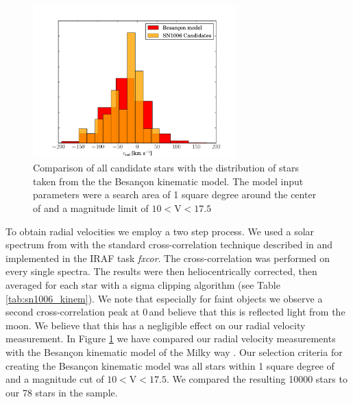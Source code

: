 \begin{figure}[tb] %
   \centering
   \includegraphics[width=0.7\textwidth]{chapter_sn1006/plots/sn1006_vrad_besancon.pdf} 
   \caption[Radial velocity of all candidates in SN 1006 compared with Besan\c{c}on Model]{Comparison of all candidate stars with the distribution of stars taken from the the Besan\c{c}on kinematic model. The model input parameters were a search area of 1 square degree around the center of  and a magnitude limit of $10<\textrm{V}<17.5$}
   \label{fig:sn1006_vrad_comp}
\end{figure}


To obtain radial velocities we employ a two step process. We used a solar spectrum from \citet{1984sfat.book.....K} with the standard cross-correlation technique described in \citet{1979AJ.....84.1511T} and implemented in the IRAF task \textit{fxcor}. The cross-correlation was performed on every single spectra. The results were then heliocentrically corrected, then averaged for each star with a sigma clipping algorithm (see Table \ref{tab:sn1006_kinem}). We note that especially for faint objects we observe a second cross-correlation peak at 0\,\kms and believe that this is reflected light from the moon. We believe that this has a negligible effect on our radial velocity measurement.
In Figure \ref{fig:sn1006_vrad_comp} we have compared our radial velocity measurements with the Besan\c{c}on kinematic model of the Milky way \citep{2003A&A...409..523R}. Our selection criteria for creating the  Besan\c{c}on kinematic model was all stars within 1 square degree of  and a magnitude cut of $10<\textrm{V}<17.5$. We compared the resulting 10000 stars to our 78 stars in the sample. 




